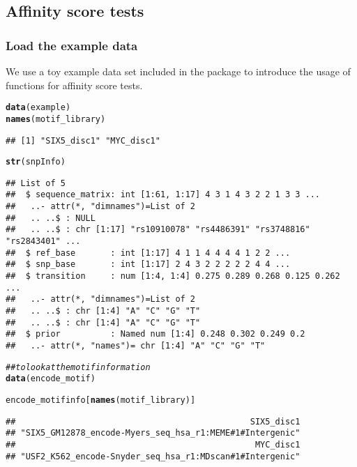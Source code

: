 \documentclass[a4paper,10pt]{article}\usepackage[]{graphicx}\usepackage[]{color}
\makeatletter
\newcommand{\hlcom}[1]{\textcolor[rgb]{0.678,0.584,0.686}{\textit{#1}}}%
\newcommand{\hlstd}[1]{\textcolor[rgb]{0.345,0.345,0.345}{#1}}%
\newcommand{\hlkwd}[1]{\textcolor[rgb]{0.737,0.353,0.396}{\textbf{#1}}}%
\newenvironment{kframe}{%
 \def\at@end@of@kframe{}%
 \ifinner\ifhmode%
  \def\at@end@of@kframe{\end{minipage}}%
  \begin{minipage}{\columnwidth}%
 \fi\fi%
 \def\FrameCommand##1{\hskip\@totalleftmargin \hskip-\fboxsep
 \colorbox{shadecolor}{##1}\hskip-\fboxsep
     \hskip-\linewidth \hskip-\@totalleftmargin \hskip\columnwidth}%
 \MakeFramed {\advance\hsize-\width
   \@totalleftmargin\z@ \linewidth\hsize
   \@setminipage}}%
 {\par\unskip\endMakeFramed%
 \at@end@of@kframe}
\newenvironment{knitrout}{}{} %
\makeatother
\begin{document}
\subsection{Affinity score tests}

\subsubsection{Load the example data}

We use a toy example data set included in the package to introduce the usage of functions for affinity score tests.

\begin{knitrout}
\color{fgcolor}\begin{kframe}
\begin{alltt}
\hlkwd{data}\hlstd{(example)}
\hlkwd{names}\hlstd{(motif_library)}
\end{alltt}
\begin{verbatim}
## [1] "SIX5_disc1" "MYC_disc1"
\end{verbatim}
\begin{alltt}
\hlkwd{str}\hlstd{(snpInfo)}
\end{alltt}
\begin{verbatim}
## List of 5
##  $ sequence_matrix: int [1:61, 1:17] 4 3 1 4 3 2 2 1 3 3 ...
##   ..- attr(*, "dimnames")=List of 2
##   .. ..$ : NULL
##   .. ..$ : chr [1:17] "rs10910078" "rs4486391" "rs3748816" "rs2843401" ...
##  $ ref_base       : int [1:17] 4 1 1 4 4 4 4 1 2 2 ...
##  $ snp_base       : int [1:17] 2 4 3 2 2 2 2 2 4 4 ...
##  $ transition     : num [1:4, 1:4] 0.275 0.289 0.268 0.125 0.262 ...
##   ..- attr(*, "dimnames")=List of 2
##   .. ..$ : chr [1:4] "A" "C" "G" "T"
##   .. ..$ : chr [1:4] "A" "C" "G" "T"
##  $ prior          : Named num [1:4] 0.248 0.302 0.249 0.2
##   ..- attr(*, "names")= chr [1:4] "A" "C" "G" "T"
\end{verbatim}
\begin{alltt}
\hlcom{## to look at the motif information}
\hlkwd{data}\hlstd{(encode_motif)}
\end{alltt}


{\ttfamily\noindent\color{warningcolor}{\#\# Warning in data(encode\_motif): data set 'encode\_motif' not found}}\begin{alltt}
\hlstd{encode_motifinfo[}\hlkwd{names}\hlstd{(motif_library)]}
\end{alltt}
\begin{verbatim}
##                                               SIX5_disc1 
## "SIX5_GM12878_encode-Myers_seq_hsa_r1:MEME#1#Intergenic" 
##                                                MYC_disc1 
## "USF2_K562_encode-Snyder_seq_hsa_r1:MDscan#1#Intergenic"
\end{verbatim}
\end{kframe}
\end{knitrout}
\end{document}
